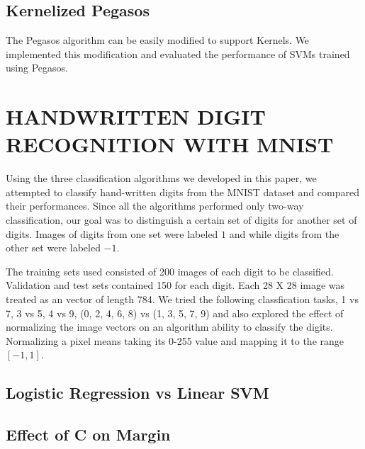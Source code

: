 \documentclass[10pt,twoside]{article}
\begin{document}
\subsection{Kernelized Pegasos}
The Pegasos algorithm can be easily modified to support Kernels. We implemented this modification and evaluated the performance of SVMs trained using Pegasos. 



\section{\uppercase{Handwritten Digit Recognition with MNIST}}
Using the three classification algorithms we developed in this paper, we attempted to classify hand-written digits from the MNIST dataset and compared their performances. Since all the algorithms performed only two-way classification, our goal was to distinguish a certain set of digits for another set of digits. Images of digits from one set were labeled $1$ and while digits from the other set were labeled $-1$.

The training sets used consisted of 200 images of each digit to be classified. Validation and test sets contained 150 for each digit. Each 28 X 28 image was treated as an vector of length 784. We tried the following classfication tasks,  1 vs 7, 3 vs 5, 4 vs 9, (0, 2, 4, 6, 8) vs (1, 3, 5, 7, 9) and also explored the effect of normalizing the image vectors on an algorithm ability to classify the digits. Normalizing a pixel means taking its 0-255 value and mapping it to the range $[-1,1]$. 

\subsection{Logistic Regression vs Linear SVM}

\subsection{Effect of C on Margin}

\vfill
\end{document}
